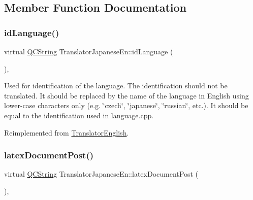 \subsection{Member Function Documentation}
\mbox{\label{class_translator_japanese_en_a920e7fc0a427b655de47f4085d331099}} 
\subsubsection{\texorpdfstring{idLanguage()}{idLanguage()}}
{\footnotesize\ttfamily virtual \mbox{\hyperlink{class_q_c_string}{Q\+C\+String}} Translator\+Japanese\+En\+::id\+Language (\begin{DoxyParamCaption}{ }\end{DoxyParamCaption})\hspace{0.3cm}{\ttfamily [inline]}, {\ttfamily [virtual]}}

Used for identification of the language. The identification should not be translated. It should be replaced by the name of the language in English using lower-\/case characters only (e.\+g. \char`\"{}czech\char`\"{}, \char`\"{}japanese\char`\"{}, \char`\"{}russian\char`\"{}, etc.). It should be equal to the identification used in language.\+cpp. 

Reimplemented from \mbox{\hyperlink{class_translator_english_a940d6ef2aa0aa8a8011426219d145a53}{Translator\+English}}.

\mbox{\label{class_translator_japanese_en_a08a448436b8cc3dd28d328ab7145112f}} 
\subsubsection{\texorpdfstring{latexDocumentPost()}{latexDocumentPost()}}
{\footnotesize\ttfamily virtual \mbox{\hyperlink{class_q_c_string}{Q\+C\+String}} Translator\+Japanese\+En\+::latex\+Document\+Post (\begin{DoxyParamCaption}{ }\end{DoxyParamCaption})\hspace{0.3cm}{\ttfamily [inline]}, {\ttfamily [virtual]}}

